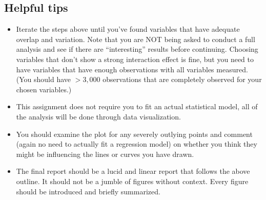 \documentclass{article}\usepackage[]{graphicx}\usepackage[]{color}
\begin{document}
\subsection*{Helpful tips}

\begin{itemize}    
    \item Iterate the steps above until you've found variables that have adequate overlap and variation. Note that you are NOT being asked to conduct a full analysis and see if there are ``interesting'' results before continuing. Choosing variables that don't show a strong interaction effect is fine, but you need to have variables that have enough observations with all variables measured. (You should have $>3,000$ observations that are completely observed for your chosen variables.)
    \item This assignment does not require you to fit an actual statistical model, all of the analysis will be done through data visualization.
    \item You should examine the plot for any severely outlying points and comment (again no need to actually fit a regression model) on whether you think they might be influencing the lines or curves you have drawn.
    \item The final report should be a lucid and linear report that follows the above outline. It should not be a jumble of figures without context. Every figure should be introduced and briefly summarized. 
\end{itemize}
\end{document}
